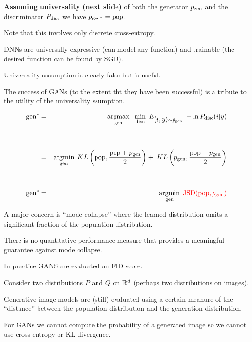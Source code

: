 {\vfill
{\bf Assuming universality (next slide)} of both the generator $p_{\mathrm{gen}}$ and the discriminator $P_{\mathrm{disc}}$ we have {\color{red} $p_{\mathrm{gen}^*} = \mathrm{pop}$}.

\vfill
Note that this involves only discrete cross-entropy.



DNNs are universally expressive (can model any function) and trainable (the desired function can be found by SGD).

\vfill
Universality assumption is clearly false but is useful.

\vfill
The success of GANs (to the extent tht they have been successful) is a tribute to the utility of the universality ssumption.



{\huge
\begin{eqnarray*}
  \mathrm{gen}^* & = & \operatorname*{argmax}_{\mathrm{gen}}\;\;\min_{\mathrm{disc}}\;E_{{\mbox{$\langle i,y\rangle$}} \sim \tilde{p}_{\mathrm{gen}}}\;-\ln P_{\mathrm{disc}}(i|y) \\
  \\
  \\
  & = & \operatorname*{argmin}_{\mathrm{gen}} \; KL\left(\mathrm{pop},\frac{\mathrm{pop}+p_{\mathrm{gen}}}{2}\right)+\;KL\left(p_{\mathrm{gen}},\frac{\mathrm{pop}+p_{\mathrm{gen}}}{2}\right) \\
  \\
  \\
  \mathrm{gen}^* & = & \operatorname*{argmin}_{\mathrm{gen}} \; {\color{red} \mathrm{JSD}(\mathrm{pop},p_{\mathrm{gen}})}
\end{eqnarray*}
}



A major concern is ``mode collapse'' where the learned distribution omits a significant fraction of the population distribution.

\vfill
There is no quantitative performance measure that provides a meaningful guarantee against mode collapse.

\vfill
In practice GANS are evaluated on FID score.


Consider two distributions $P$ and $Q$ on $\mathbb{R}^d$ (perhaps two distributions on images).

\vfill
Generative image models are (still) evaluated using a certain meanure of the ``distance'' between the population distribution
and the generation distribution.

\vfill
For GANs we cannot compute the probability of a generated image so we cannot use cross entropy or KL-divergence.

}
